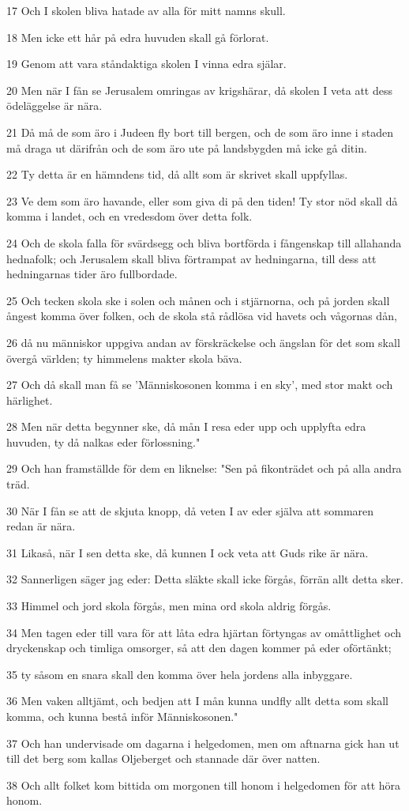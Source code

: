 \par 17 Och I skolen bliva hatade av alla för mitt namns skull.
\par 18 Men icke ett hår på edra huvuden skall gå förlorat.
\par 19 Genom att vara ståndaktiga skolen I vinna edra själar.
\par 20 Men när I fån se Jerusalem omringas av krigshärar, då skolen I veta att dess ödeläggelse är nära.
\par 21 Då må de som äro i Judeen fly bort till bergen, och de som äro inne i staden må draga ut därifrån och de som äro ute på landsbygden må icke gå ditin.
\par 22 Ty detta är en hämndens tid, då allt som är skrivet skall uppfyllas.
\par 23 Ve dem som äro havande, eller som giva di på den tiden! Ty stor nöd skall då komma i landet, och en vredesdom över detta folk.
\par 24 Och de skola falla för svärdsegg och bliva bortförda i fångenskap till allahanda hednafolk; och Jerusalem skall bliva förtrampat av hedningarna, till dess att hedningarnas tider äro fullbordade.
\par 25 Och tecken skola ske i solen och månen och i stjärnorna, och på jorden skall ångest komma över folken, och de skola stå rådlösa vid havets och vågornas dån,
\par 26 då nu människor uppgiva andan av förskräckelse och ängslan för det som skall övergå världen; ty himmelens makter skola bäva.
\par 27 Och då skall man få se 'Människosonen komma i en sky', med stor makt och härlighet.
\par 28 Men när detta begynner ske, då mån I resa eder upp och upplyfta edra huvuden, ty då nalkas eder förlossning."
\par 29 Och han framställde för dem en liknelse: "Sen på fikonträdet och på alla andra träd.
\par 30 När I fån se att de skjuta knopp, då veten I av eder själva att sommaren redan är nära.
\par 31 Likaså, när I sen detta ske, då kunnen I ock veta att Guds rike är nära.
\par 32 Sannerligen säger jag eder: Detta släkte skall icke förgås, förrän allt detta sker.
\par 33 Himmel och jord skola förgås, men mina ord skola aldrig förgås.
\par 34 Men tagen eder till vara för att låta edra hjärtan förtyngas av omåttlighet och dryckenskap och timliga omsorger, så att den dagen kommer på eder oförtänkt;
\par 35 ty såsom en snara skall den komma över hela jordens alla inbyggare.
\par 36 Men vaken alltjämt, och bedjen att I mån kunna undfly allt detta som skall komma, och kunna bestå inför Människosonen."
\par 37 Och han undervisade om dagarna i helgedomen, men om aftnarna gick han ut till det berg som kallas Oljeberget och stannade där över natten.
\par 38 Och allt folket kom bittida om morgonen till honom i helgedomen för att höra honom.

